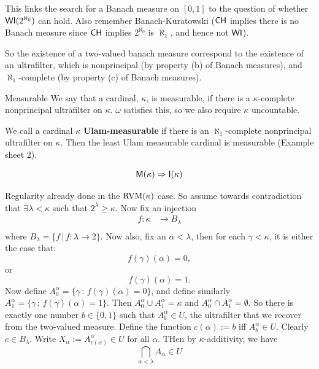 \documentclass{article}
\begin{document}
\begin{remark*}
    This links the search for a Banach measure on $[0,1]$ to the question of whether $\mathsf{WI}(2^{\aleph_{0}})$ can hold. Also remember Banach-Kuratowski ($\mathsf{CH}$ implies there is no Banach measure since $\mathsf{CH}$ implies $2^{\aleph_{0}}$ is $\aleph_{1}$, and hence not $\mathsf{WI}$).
\end{remark*}
So the existence of a two-valued banach measure correspond to the existence of an ultrafilter, which is nonprincipal (by property (b) of Banach measures), and $\aleph_{1}$-complete (by property (c) of Banach measures).
 
\newlec

\begin{fancydefine}{Measurable}
    We say that a cardinal, $\kappa$, is measurable, if there is a $\kappa$-complete nonprincipal ultrafilter on $\kappa$. $\omega$ satisfies this, so we also require $\kappa$ uncountable.
\end{fancydefine}
\begin{remark*}
    We call a cardinal $\kappa$ \textbf{Ulam-measurable} if there is an $\aleph_{1}$-complete nonprincipal ultrafilter on $\kappa$. Then the least Ulam measurable cardinal is measurable (Example sheet 2).
\end{remark*}
\begin{fancythm}{}
    \[\mathsf{M}(\kappa) \Rightarrow \mathsf{I}(\kappa)\]
\end{fancythm}
\proof Regularity already done in the $\operatorname{RVM}(\kappa)$ case. So assume towards contradiction that $\exists \lambda < \kappa$ such that $2^{\lambda} \geq \kappa$. Now fix an injection \begin{align*}
    f : \kappa &\to  B_{\lambda}\\
\end{align*}
where $B_{\lambda} = \{f \, | \, f : \lambda \to 2\}$. Now also, fix an $\alpha< \lambda$, then for each $\gamma < \kappa$, it is either the case that:
\[ f(\gamma)(\alpha)=0,\] or 
\[ f(\gamma)(\alpha)=1.\]
Now define $A_{0}^{\alpha}= \{ \gamma \, : \, f(\gamma)(\alpha)=0\}$, and define similarly $A_{1}^{\alpha} = \{ \gamma \, : \, f(\gamma)(\alpha) = 1\}$.
Then $A_{0}^{\alpha} \cup A_{1}^{\alpha} = \kappa$ and $A_{0}^{\alpha} \cap A_{1}^{\alpha} = \emptyset$. So there is exactly one number $b \in \{0,1\}$ such that $A_{b}^{\alpha} \in U$, the ultrafilter that we recover from the two-valued measure.\gap 
Define the function $c(\alpha):=b$ iff $A_{b}^{\alpha} \in U$. Clearly $c \in B_{\lambda}$. Write $X_{\alpha}:= A_{c(\alpha)}^{\alpha} \in U$ for all $\alpha$. THen by $\kappa$-additivity, we have \[ \bigcap_{\alpha < \lambda} A_{\alpha} \in U\]
\end{document}
